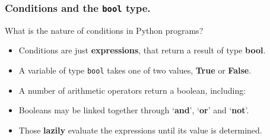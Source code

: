 \documentclass{beamer} %
\newcommand\emc[1]{\textcolor{midred}{\textbf{#1}}}
\begin{document}


\begin{frame}

\frametitle{Conditions and the \texttt{bool} type.} 

What is the nature of conditions in Python programs?
\begin{itemize}
\item Conditions are just \emc{expressions}, that return a result of type \emc{bool}.
\item A variable of type \texttt{bool} takes one of two values, \emc{True} or \emc{False}.
\item A number of arithmetic operators return a boolean, including:
\item Booleans may be linked together through `\emc{and}', `\emc{or}' and `\emc{not}'.
\item Those \emc{lazily} evaluate the expressions until its value is determined.
\end{itemize}

\end{frame}
\end{document}
